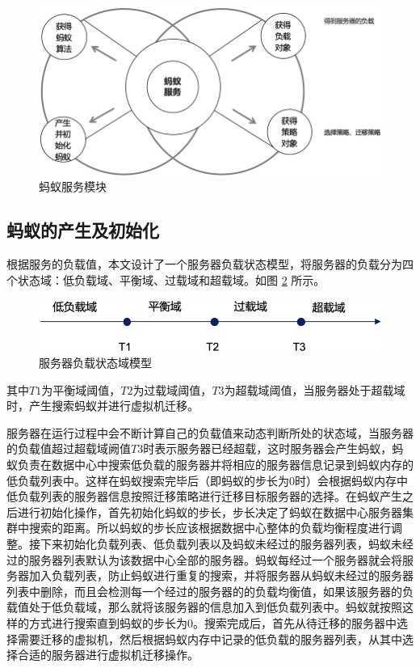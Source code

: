 \begin{figure}[htb]
  \centering
  \includegraphics{./Figure/IMG_Chap3_3.png}
  \caption{蚂蚁服务模块}\label{Fig:chap3_3}
\end{figure}

\subsection{蚂蚁的产生及初始化}
根据服务的负载值，本文设计了一个服务器负载状态模型，将服务器的负载分为四个状态域：低负载域、平衡域、过载域和超载域。如图 \ref{Fig:chap3_4} 所示。

\begin{figure}[htb]
  \centering
  \includegraphics{./Figure/IMG_Chap3_4.png}
  \caption{服务器负载状态域模型}\label{Fig:chap3_4}
\end{figure}

其中$ T1 $为平衡域阈值，$ T2 $为过载域阈值，$ T3 $为超载域阈值，当服务器处于超载域时，产生搜索蚂蚁并进行虚拟机迁移\cite{王光波}。

服务器在运行过程中会不断计算自己的负载值来动态判断所处的状态域，当服务器的负载值超过超载域阙值$ T3 $时表示服务器已经超载，这时服务器会产生蚂蚁，蚂蚁负责在数据中心中搜索低负载的服务器并将相应的服务器信息记录到蚂蚁内存的低负载列表中。这样在蚂蚁搜索完毕后（即蚂蚁的步长为0时）会根据蚂蚁内存中低负载列表的服务器信息按照迁移策略进行迁移目标服务器的选择。在蚂蚁产生之后进行初始化操作，首先初始化蚂蚁的步长，步长决定了蚂蚁在数据中心服务器集群中搜索的距离。所以蚂蚁的步长应该根据数据中心整体的负载均衡程度进行调整。接下来初始化负载列表、低负载列表以及蚂蚁未经过的服务器列表，蚂蚁未经过的服务器列表默认为该数据中心全部的服务器。蚂蚁每经过一个服务器就会将服务器加入负载列表，防止蚂蚁进行重复的搜索，并将服务器从蚂蚁未经过的服务器列表中删除，而且会检测每一个经过的服务器的的负载均衡值，如果该服务器的负载值处于低负载域，那么就将该服务器的信息加入到低负载列表中。蚂蚁就按照这样的方式进行搜索直到蚂蚁的步长为0。搜索完成后，首先从待迁移的服务器中选择需要迁移的虚拟机，然后根据蚂蚁内存中记录的低负载的服务器列表，从其中选择合适的服务器进行虚拟机迁移操作。

